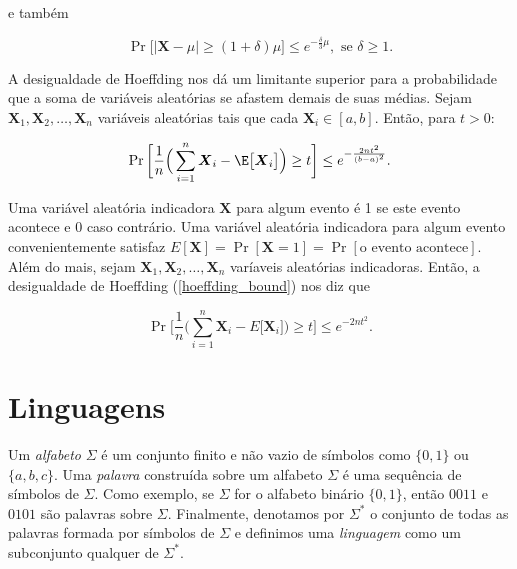 e também

\begin{equation*}
    \Pr \bigg[ \Big\lvert \boldsymbol{X} - \mu \Big\rvert \geq (1 + \delta)\mu \bigg] \leq e^{-\frac{\delta}{3}\mu}, \text{ se } \delta \geq 1.
\end{equation*}

A desigualdade de Hoeffding nos dá um limitante superior para a probabilidade que a soma de variáveis aleatórias se afastem demais de suas médias. Sejam $\boldsymbol{X}_{1}, \boldsymbol{X}_{2}, \dots, \boldsymbol{X}_{n}$ variáveis aleatórias tais que cada $\boldsymbol{X}_{i} \in [a, b]$. Então, para $t > 0$: 

\begin{equation} \label{hoeffding_bound}
    \Pr \bigg[\frac{1}{n} \Big( \sum_{i = 1}^{n} \boldsymbol{X}_{i} - \E\big[ \boldsymbol{X}_{i} \big] \Big) \geq t \bigg] \leq e^{-\frac{2nt^{2}}{(b - a)^{2}}}.
\end{equation}

Uma variável aleatória indicadora $\boldsymbol{X}$ para algum evento é 1 se este evento acontece e 0 caso contrário. Uma variável aleatória indicadora para algum evento convenientemente satisfaz $E[\boldsymbol{X}] = \Pr[\boldsymbol{X} = 1] = \Pr[\text{o evento acontece}]$. Além do mais, sejam $\boldsymbol{X}_{1}, \boldsymbol{X}_{2}, \dots, \boldsymbol{X}_{n}$ varíaveis aleatórias indicadoras. Então, a desigualdade de Hoeffding (\ref{hoeffding_bound}) nos diz que

\begin{equation} \label{hoeffding_bound_irv}
    \Pr \bigg[ \frac{1}{n}\Big( \sum_{i = 1}^{n} \boldsymbol{X}_{i} - E\big[ \boldsymbol{X}_{i} \big] \Big) \geq t \bigg] \leq e^{-2nt^{2}}.
\end{equation}

\section{Linguagens} \label{section_languages}

Um \emph{alfabeto} $\Sigma$ é um conjunto finito e não vazio de símbolos como $\{0, 1\}$ ou $\{a, b, c\}$. Uma \emph{palavra} construída sobre um alfabeto $\Sigma$ é uma sequência de símbolos de $\Sigma$. Como exemplo, se $\Sigma$ for o alfabeto binário $\{0, 1\}$, então $0011$ e $0101$ são palavras sobre $\Sigma$. Finalmente, denotamos por $\Sigma^{*}$ o conjunto de todas as palavras formada por símbolos de $\Sigma$ e definimos uma \emph{linguagem} como um subconjunto qualquer de $\Sigma^{*}$.

